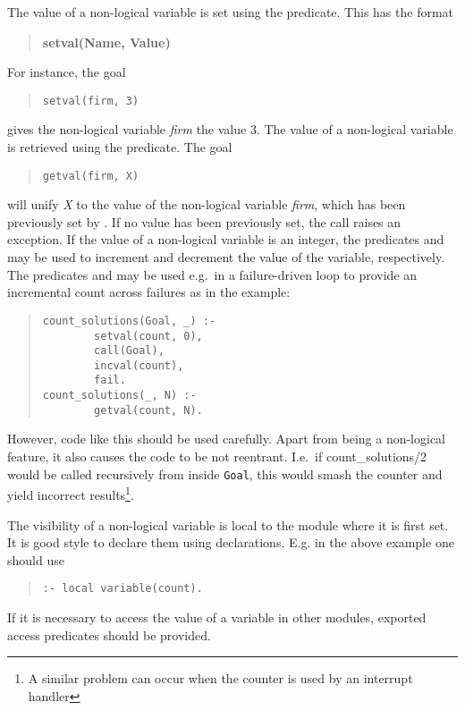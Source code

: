 The value of a non-logical variable is set using the  predicate.
This has the format
\begin{quote}
{\bf setval(Name, Value)}
\end{quote}
For instance, the goal \begin{quote}\begin{verbatim}
setval(firm, 3)\end{verbatim}\end{quote}
gives the non-logical variable {\it firm} the value 3.
The value of a non-logical variable is retrieved using the  predicate.
The goal \begin{quote}\begin{verbatim}
getval(firm, X)\end{verbatim}\end{quote}
will unify {\it X} to
the value of the non-logical variable {\it firm}, which has been previously set by
.
If no value has been previously set, the call raises an exception.
If the value of a non-logical variable is an integer, the predicates 
and  may be used to increment and decrement the value of the
variable, respectively.
The predicates  and
 may be used e.g.\ in a failure-driven loop to provide
an incremental count across failures as in the example:
\begin{quote}\begin{verbatim}
count_solutions(Goal, _) :-
        setval(count, 0),
        call(Goal),
        incval(count),
        fail.
count_solutions(_, N) :-
        getval(count, N).
\end{verbatim}\end{quote}
However, code like this should be used carefully.
Apart from being a non-logical feature, it also causes the code to be
not reentrant. I.e.\ if count_solutions/2 would be called recursively from
inside {\tt Goal}, this would smash the counter and yield incorrect
results\footnote{A similar problem can occur when the counter is used
by an interrupt handler}.

The visibility of a non-logical variable is local to the module
where it is first set. It is good style to declare them using
declarations. E.g. in the above example one should use
\begin{quote}\begin{verbatim}
:- local variable(count).
\end{verbatim}\end{quote}
If it is necessary to access the value of a variable in other modules,
exported access predicates should be provided.



